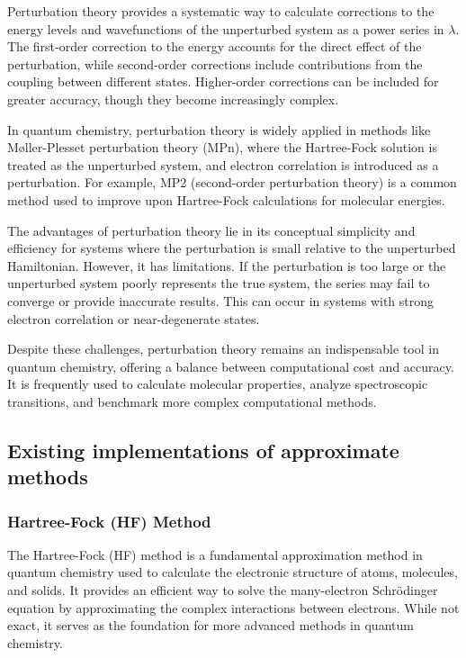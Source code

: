 Perturbation theory provides a systematic way to calculate corrections to the energy levels and wavefunctions of the unperturbed system as a power series in $\lambda$. The first-order correction to the energy accounts for the direct effect of the perturbation, while second-order corrections include contributions from the coupling between different states. Higher-order corrections can be included for greater accuracy, though they become increasingly complex.

In quantum chemistry, perturbation theory is widely applied in methods like Møller-Plesset perturbation theory (MPn), where the Hartree-Fock solution is treated as the unperturbed system, and electron correlation is introduced as a perturbation. For example, MP2 (second-order perturbation theory) is a common method used to improve upon Hartree-Fock calculations for molecular energies.

The advantages of perturbation theory lie in its conceptual simplicity and efficiency for systems where the perturbation is small relative to the unperturbed Hamiltonian. However, it has limitations. If the perturbation is too large or the unperturbed system poorly represents the true system, the series may fail to converge or provide inaccurate results. This can occur in systems with strong electron correlation or near-degenerate states.

Despite these challenges, perturbation theory remains an indispensable tool in quantum chemistry, offering a balance between computational cost and accuracy. It is frequently used to calculate molecular properties, analyze spectroscopic transitions, and benchmark more complex computational methods.



\subsection{Existing implementations of approximate methods}

\subsubsection{Hartree-Fock (HF) Method}

The Hartree-Fock (HF) method is a fundamental approximation method in quantum chemistry used to calculate the electronic structure of atoms, molecules, and solids. It provides an efficient way to solve the many-electron Schrödinger equation by approximating the complex interactions between electrons. While not exact, it serves as the foundation for more advanced methods in quantum chemistry.

